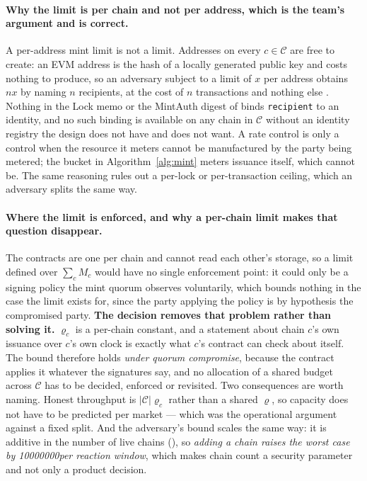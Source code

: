 \paragraph{Why the limit is per chain and not per address, which is the team's argument and is
correct.}
A per-address mint limit is not a limit. Addresses on every $c \in \mathcal{C}$ are free to create:
an EVM address is the hash of a locally generated public key and costs nothing to produce, so an
adversary subject to a limit of $x$ per address obtains $nx$ by naming $n$ recipients, at the cost of
$n$ transactions and nothing else  \srcinferred. Nothing in
the Lock memo or the MintAuth digest of  binds \texttt{recipient} to an identity, and
no such binding is available on any chain in $\mathcal{C}$ without an identity registry the design
does not have and does not want. A rate control is only a control when the resource it meters cannot
be manufactured by the party being metered; the bucket in Algorithm~\ref{alg:mint} meters issuance
itself, which cannot be. The same reasoning rules out a per-lock or per-transaction ceiling, which an
adversary splits the same way.

\paragraph{Where the limit is enforced, and why a per-chain limit makes that question disappear.}
The contracts are one per chain and cannot read each other's storage, so a limit defined over
$\sum_{c} M_c$ would have no single enforcement point: it could only be a signing policy the mint
quorum observes voluntarily, which bounds nothing in the case the limit exists for, since the party
applying the policy is by hypothesis the compromised party. \textbf{The decision removes that
problem rather than solving it.} $\varrho_c$ is a per-chain constant, and a statement about chain
$c$'s own issuance over $c$'s own clock is exactly what $c$'s contract can check about itself. The
bound therefore holds \emph{under quorum compromise}, because the contract applies it whatever the
signatures say, and no allocation of a shared budget across $\mathcal{C}$ has to be decided,
enforced or revisited. Two consequences are worth naming. Honest throughput is $|\mathcal{C}|
\varrho_c$ rather than a shared $\varrho$, so capacity does not have to be predicted per market ---
which was the operational argument against a fixed split. And the adversary's bound scales the same
way: it is additive in the number of live chains (), so \emph{adding a chain
raises the worst case by \num{10000000}\flux per reaction window}, which makes chain count a security
parameter and not only a product decision.

